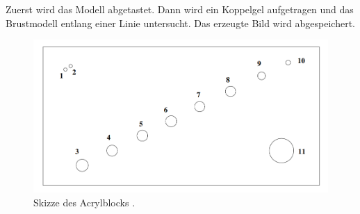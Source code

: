 Zuerst wird das Modell abgetastet. Dann wird ein Koppelgel aufgetragen und das Brustmodell entlang einer Linie untersucht. Das erzeugte Bild wird abgespeichert.
\begin{figure}[H]
    \centering
    \includegraphics[width=1\textwidth]{img/block.png}
    \caption{Skizze des Acrylblocks \cite{US1}.}
    \label{fig:block}
\end{figure}